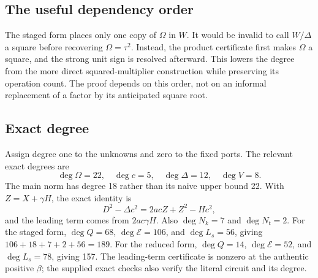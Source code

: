 \subsection{The useful dependency order}

The staged form places only one copy of $\Omega$ in $W$.
It would be invalid to call $W/\Delta$ a square before recovering
$\Omega=\tau^2$. Instead, the product certificate first makes $\Omega$
a square, and the strong unit sign is resolved afterward. This lowers the
degree from the more direct squared-multiplier construction while preserving
its operation count. The proof depends on this order, not on an informal
replacement of a factor by its anticipated square root.

\subsection{Exact degree}

Assign degree one to the unknowns and zero to the fixed ports. The relevant
exact degrees are
\[
\deg\Omega=22,\quad\deg c=5,\quad\deg\Delta=12,\quad\deg V=8.
\]
The main norm has degree 18 rather than its naive upper bound 22. With
$Z=X+\gamma H$, the exact identity is
\[
D^2-\Delta c^2=2acZ+Z^2-Hc^2,
\]
and the leading term comes from $2ac\gamma H$.
Also $\deg N_k=7$ and $\deg N_t=2$.
For the staged form, $\deg Q=68$, $\deg\mathcal E=106$, and
$\deg L_s=56$, giving $106+18+7+2+56=189$.
For the reduced form, $\deg Q=14$, $\deg\mathcal E=52$, and
$\deg L_s=78$, giving 157.
The leading-term certificate is nonzero at the authentic positive $\beta$;
the supplied exact checks also verify the literal circuit and its degree.
